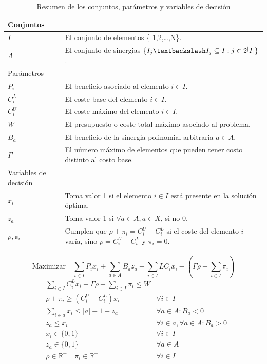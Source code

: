 \documentclass[spanish, a4paper, 12pt, openany,final]{book}
\begin{document}
 \begingroup 
 \renewcommand{\arraystretch}{1.4}
  \begin{table}[H]
  \caption{Resumen de los conjuntos, parámetros y variables de decisión}
  \begin{tabular}{l p{11cm}}
  	\hline
  	Conjuntos & \\
  	\hline
  	$I$ & El conjunto de elementos \{ 1,2,\dots,N\}.\\
  	$A$& El conjunto de sinergias $\{ I_j \textbackslash I_j \subseteq I:j\in 2^|I| \}$.\\
  	\hline Parámetros & \\ \hline
  	
  	$P_i$ & El beneficio asociado al elemento $i \in I$. \\
  	$C^L_i$& El coste base del elemento $i \in I$.    \\
  	$C^U_i$& El coste máximo del elemento $i \in I$.     \\
  	$W$& El presupuesto o coste total máximo asociado al problema.\\
  	$B_a$ & El beneficio de la sinergia polinomial arbitraria $a \in A$.\\
  	$\Gamma$& El número máximo de elementos que pueden tener costo distinto al costo base.\\
  	
  	\hline Variables de decisión &\\ \hline
  	$x_i$ & Toma valor 1 si el elemento $i \in I$ está presente en la solución óptima.\\
  	$z_a$ & Toma valor 1 si $\forall a \in A, a \in X$, si no 0.\\
  	$\mathbb{\rho}, \mathbb{\pi}_i$ & Cumplen que  $\rho + \pi_i  = C_i^U - C_i^L$ si el coste del elemento $i$ varía, sino $\rho = C_i^U - C_i^L$ y $\pi_i = 0$.\\
  	\hline
  	
  \end{tabular}
  \end{table} 
  
  \endgroup
    
	
\begin{equation}
	\text{Maximizar} \quad \sum_{i\in I} P_i x_i + \sum_{a\in A} B_a z_a - \sum_{i\in I} LC_i x_i - \left(\Gamma\rho+\sum_{i\in I} \pi_i\right) \label{eq:of}
\end{equation}
\begin{align}	 
	&\sum_{i\in I} C_i^L x_i + \Gamma\rho + \sum_{i\in I} \pi_i \leq W& \label{eq:costs} \\
	&\rho + \pi_i \geq (C_i^U - C_i^L) x_i & \forall i \in I \label{eq:cost_relax} \\
	&\sum_{i\in a} x_i \leq |a| - 1 + z_a & \forall a \in A:B_a < 0 \label{eq:fijar_z} \\
	&z_a \leq x_i & \forall i \in a, \forall a \in A : B_a > 0 \label{eq:fijar_z_2} \\
	&x_i \in \{0,1\} \quad &\forall i \in I \\
	&z_a \in \{0,1\} \quad &\forall a \in A \\
	&\rho \in \mathbb{R}^{+} \quad \pi_i \in \mathbb{R}^{+} &\forall i \in I \label{eq:dom}
\end{align}
	
\end{document}

